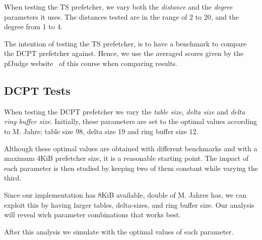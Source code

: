 When testing the TS prefetcher, we vary both the \emph{distance} and the
\emph{degree} parameters it uses. The distances tested are in the range of 2 to
20, and the degree from 1 to 4.

The intention of testing the TS prefetcher, is to have a benchmark to compare
the DCPT prefetcher against. Hence, we use the averaged scores given by the
pfJudge website~\cite[Sec.~2.5]{guidelines} of this course when comparing
results.

\subsection{DCPT Tests}

When testing the DCPT prefetcher we vary the \emph{table size}, \emph{delta
size} and \emph{delta ring buffer size}. Initially, these parameters are set to
the optimal values according to
M. Jahre\cite{dcpt}; table size 98, delta size 19 and ring buffer size 12.

Although these optimal values are obtained with different benchmarks and with a
maximum 4KiB prefetcher size, it is a reasonable starting point. The impact of
each parameter is then studied by keeping two of them constant while varying the
third.

Since our implementation has 8KiB available, double of M. Jahres \cite{dcpt}
has, we can exploit this by having larger tables, delta-sizes, and ring buffer
size. Our analysis will reveal wich parameter combinations that works best.

After this analysis we simulate with the optimal values of each parameter.

